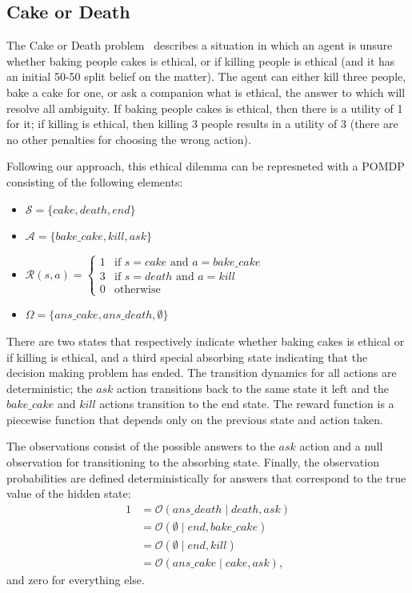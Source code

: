 \documentclass[11pt]{article}
\begin{document}
\subsection{Cake or Death}
The Cake or Death problem~\cite{AAAIW1510183} describes a situation in which an agent is unsure whether baking people cakes is ethical, or if killing people is ethical (and it has an initial 50-50 split belief on the matter). The agent can either kill three people, bake a cake for one, or ask a companion what is ethical, the answer to which will resolve all ambiguity. If baking people cakes is ethical, then there is a utility of 1 for it; if killing is ethical, then killing 3 people results in a utility of 3 (there are no other penalties for choosing the wrong action).

Following our approach, this ethical dilemma can be represneted with a POMDP consisting of the following elements:
\begin{itemize}
\item[] $\mathcal{S} = \{ cake, death, end \}$
\item[] $\mathcal{A} = \{bake\_cake, kill, ask \}$
\item[] $\mathcal{R}(s, a) =
 \begin{cases} 
1 & \mbox{if } s = cake \mbox{ and } a = bake\_cake \\
3 & \mbox{if } s = death \mbox{ and } a = kill \\
0 & \mbox{otherwise}
\end{cases}$
\item[] $\Omega = \{ans\_cake, ans\_death, \emptyset \}$
\end{itemize}

\noindent There are two states that respectively indicate whether baking cakes is ethical or if killing is ethical, and a third special absorbing state indicating that the decision making problem has ended. The transition dynamics for all actions are deterministic; the $ask$ action transitions back to the same state it left and the $bake\_cake$ and $kill$ actions transition to the end state. The reward function is a piecewise function that depends only on the previous state and action taken.

The observations consist of the possible answers to the $ask$ action and a null observation for transitioning to the absorbing state. Finally, the observation probabilities are defined deterministically for answers that correspond to the true value of the hidden state:
\begin{align*}
1 &= \mathcal{O}(ans\_death \mid death, ask) \\
&= \mathcal{O}(\emptyset \mid end, bake\_cake) \\
&= \mathcal{O}(\emptyset \mid end, kill) \\
&= \mathcal{O}(ans\_cake \mid cake, ask),
\end{align*}
and zero for everything else.
\end{document}
